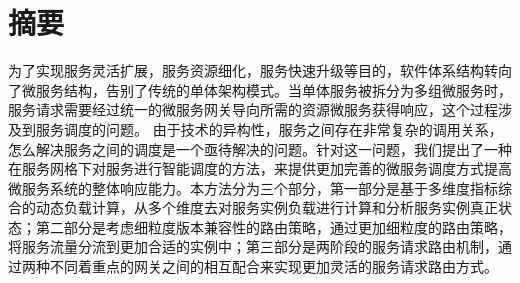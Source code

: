 \section*{摘要}
为了实现服务灵活扩展，服务资源细化，服务快速升级等目的，软件体系结构转向了微服务结构，告别了传统的单体架构模式。当单体服务被拆分为多组微服务时，服务请求需要经过统一的微服务网关导向所需的资源微服务获得响应，这个过程涉及到服务调度的问题。
由于技术的异构性，服务之间存在非常复杂的调用关系，怎么解决服务之间的调度是一个亟待解决的问题。针对这一问题，我们提出了一种在服务网格下对服务进行智能调度的方法，来提供更加完善的微服务调度方式提高微服务系统的整体响应能力。本方法分为三个部分，第一部分是基于多维度指标综合的动态负载计算，从多个维度去对服务实例负载进行计算和分析服务实例真正状态；第二部分是考虑细粒度版本兼容性的路由策略，通过更加细粒度的路由策略，将服务流量分流到更加合适的实例中；第三部分是两阶段的服务请求路由机制，通过两种不同着重点的网关之间的相互配合来实现更加灵活的服务请求路由方式。
\newpage
